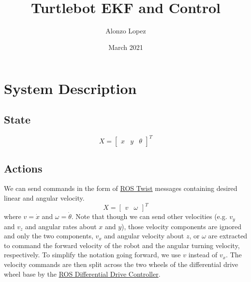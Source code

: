 \documentclass{article}
\title{Turtlebot EKF and Control}
\author{Alonzo Lopez}
\date{March 2021}
\begin{document}
\maketitle

\section{System Description}
\subsection{State}
\begin{equation}
    X = \begin{bmatrix}
    x & y & \theta
    \end{bmatrix}^T
\end{equation}

\subsection{Actions}
We can send commands in the form of \href{https://docs.ros.org/en/api/geometry_msgs/html/msg/Twist.html}{ROS Twist} messages containing desired linear and angular velocity. 
\begin{equation}
    X = \begin{bmatrix}
    v & \omega
    \end{bmatrix}^T
\end{equation}
where $v = \dot x$ and $\omega = \dot \theta$.
Note that though we can send other velocities (e.g. $v_y$ and $v_z$ and angular rates about $x$ and $y$), those velocity components are ignored and only the two components,
$v_x$ and angular velocity about $z$, or $\omega$ are extracted to command the forward velocity of the robot and the angular turning velocity, respectively.
To simplify the notation going forward, we use $v$ instead of $v_x$.
The velocity commands are then split across the two wheels of the differential drive wheel base by the 
\href{https://github.com/ros-controls/ros_controllers/wiki/diff_drive_controller}{ROS Differential Drive Controller}.
\end{document}
